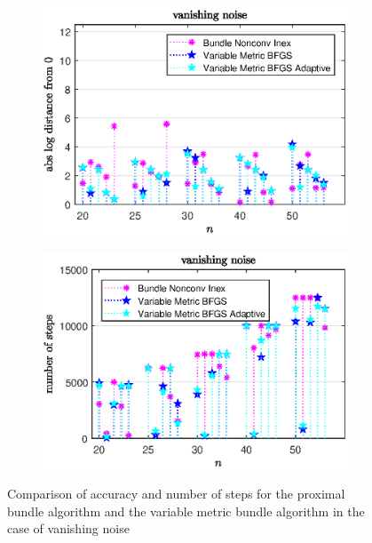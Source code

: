 \vspace{-1.5em}

\begin{figure}[H]
	\begin{subfigure}{0.49\textwidth}
		\includegraphics[width=\textwidth]{Pictures/Plots/vanishing_noise_b.eps}%
	\end{subfigure}
	\begin{subfigure}{0.49\textwidth}
		\includegraphics[width=\textwidth]{Pictures/Plots/steps_vanishing_noise_b.eps}%
	\end{subfigure}
	\caption{Comparison of accuracy and number of steps for the proximal bundle algorithm and the variable metric bundle algorithm in the case of vanishing noise}%
	\label{fig_van_noise_large}%
\end{figure}

